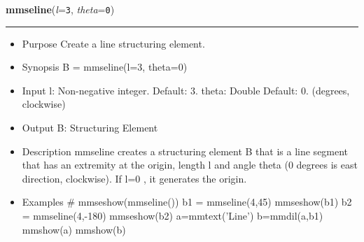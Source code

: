     \begin{boxedminipage}{\textwidth}

    \raggedright \textbf{mmseline}(\textit{l}=\texttt{3\-}, \textit{theta}=\texttt{0\-})

    \vspace{-1.5ex}

    \rule{\textwidth}{0.5\fboxrule}
    \begin{itemize}
    \setlength{\parskip}{0.6ex}
      \item Purpose Create a line structuring element.

      \item Synopsis B = mmseline(l=3, theta=0)

      \item Input l: Non-negative integer. Default: 3. theta: Double Default: 
        0. (degrees, clockwise)

      \item Output B: Structuring Element

      \item Description mmseline creates a structuring element B that is a 
        line segment that has an extremity at the origin, length l and 
        angle theta (0 degrees is east direction, clockwise). If l=0 , it 
        generates the origin.

      \item Examples \# mmseshow(mmseline()) b1 = mmseline(4,45) mmseshow(b1) 
        b2 = mmseline(4,-180) mmseshow(b2) a=mmtext('Line') b=mmdil(a,b1) 
        mmshow(a) mmshow(b)

    \end{itemize}

    \vspace{1ex}

    \end{boxedminipage}

    \label{multireg:num_pymorph:mmsereflect}
    \vspace{0.5ex}

